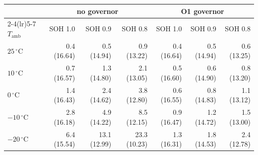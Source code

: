 \begin{tabular}{lrrrrrr}
\toprule
 & \multicolumn{3}{c}{no governor} & \multicolumn{3}{c}{O1 governor} \\
\cmidrule(lr){2-4}\cmidrule(lr){5-7}
$T_\mathrm{amb}$ & SOH 1.0 & SOH 0.9 & SOH 0.8 & SOH 1.0 & SOH 0.9 & SOH 0.8 \\
\midrule
$25\,^\circ$C & 0.4 (16.64) & 0.5 (14.94) & 0.9 (13.22) & 0.4 (16.64) & 0.5 (14.94) & 0.6 (13.25) \\
$10\,^\circ$C & 0.7 (16.57) & 1.3 (14.80) & 2.1 (13.05) & 0.5 (16.60) & 0.6 (14.90) & 0.8 (13.20) \\
$0\,^\circ$C & 1.4 (16.43) & 2.4 (14.62) & 3.8 (12.80) & 0.6 (16.55) & 0.8 (14.83) & 1.1 (13.12) \\
$-10\,^\circ$C & 2.8 (16.18) & 4.9 (14.22) & 8.5 (12.15) & 0.9 (16.47) & 1.2 (14.72) & 1.5 (13.00) \\
$-20\,^\circ$C & 6.4 (15.54) & 13.1 (12.99) & 23.3 (10.23) & 1.3 (16.31) & 1.8 (14.53) & 2.4 (12.78) \\
\bottomrule
\end{tabular}
